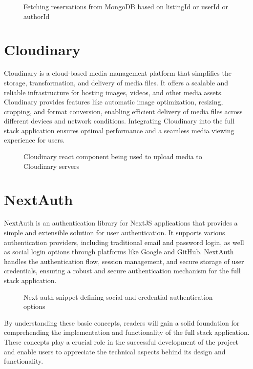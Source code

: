 \begin{figure}[!ht]
    
    \caption{Fetching reservations from MongoDB based on listingId or userId or authorId}\label{fig:mongo}
\end{figure}

\section{Cloudinary}
Cloudinary is a cloud-based media management platform that simplifies the storage, transformation, and delivery of media files. It offers a scalable and reliable infrastructure for hosting images, videos, and other media assets. Cloudinary provides features like automatic image optimization, resizing, cropping, and format conversion, enabling efficient delivery of media files across different devices and network conditions. Integrating Cloudinary into the full stack application ensures optimal performance and a seamless media viewing experience for users.

\begin{figure}[!ht]
    
    \caption{Cloudinary react component being used to upload media to Cloudinary servers}\label{fig:cloudinary}
\end{figure}

\section{NextAuth}
NextAuth is an authentication library for NextJS applications that provides a simple and extensible solution for user authentication. It supports various authentication providers, including traditional email and password login, as well as social login options through platforms like Google and GitHub. NextAuth handles the authentication flow, session management, and secure storage of user credentials, ensuring a robust and secure authentication mechanism for the full stack application.

\begin{figure}[!ht]
    
    \caption{Next-auth snippet defining social and credential authentication options}\label{fig:next-auth}
\end{figure}

By understanding these basic concepts, readers will gain a solid foundation for comprehending the implementation and functionality of the full stack application. These concepts play a crucial role in the successful development of the project and enable users to appreciate the technical aspects behind its design and functionality.

